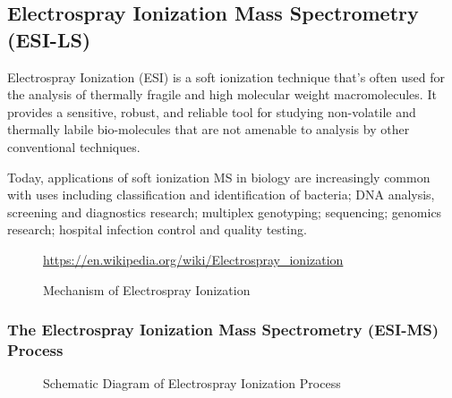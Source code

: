 \documentclass[letterpaper, 10 pt, conference]{ieeeconf}  %
\begin{document}
        \subsection[\textbf{Electrospray Ionization Mass Spectrometry}]{\textbf{Electrospray Ionization Mass Spectrometry (ESI-LS)}}

       Electrospray Ionization (ESI) is a soft ionization technique that's often used for the analysis of thermally fragile and high molecular weight macromolecules. It provides a sensitive, robust, and reliable tool for studying non-volatile and thermally labile bio-molecules that are not amenable to analysis by other conventional techniques.\autocite{R6}
        
        Today, applications of soft ionization MS in biology are increasingly common with uses including classification and identification of bacteria; DNA analysis, screening and diagnostics research; multiplex genotyping; sequencing; genomics research; hospital infection control and quality testing.\autocite{R1}

        \begin{figure}[h]
            \centering
        
            \caption{Mechanism of Electrospray Ionization}
            \tiny{\url{https://en.wikipedia.org/wiki/Electrospray_ionization}}

        \end{figure}

        \subsubsection[\textbf{The Electrospray Ionization Mass Spectrometry Process}]{\textbf{The Electrospray Ionization Mass Spectrometry (ESI-MS) Process}} \hfill

        \begin{figure}[h]
            \centering
        
            \caption{Schematic Diagram of Electrospray Ionization Process\autocite{R6}}
        \end{figure}
 
\end{document}
